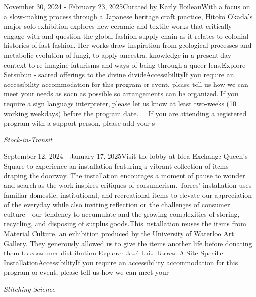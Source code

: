 \documentclass[letterpaper, 10pt]{article}
\newcommand{\subtitle}[1]{\textit{\large #1}\vspace{0.5em}}
\newcommand{\articlecontent}[1]{\small #1\vspace{1em}}
\begin{document}
\begin{multicols}{2}
{November 30, 2024 - February 23, 2025Curated by Karly BoileauWith a focus on a slow-making process through a Japanese heritage craft practice, Hitoko Okada’s major solo exhibition explores new ceramic and textile works that critically engage with and question the global fashion supply chain as it relates to colonial histories of fast fashion. Her works draw inspiration from geological processes and metabolic evolution of fungi, to apply ancestral knowledge in a present-day context to re-imagine futurisms and ways of being through a queer lens.Explore Setsubun - sacred offerings to the divine divideAccessibilityIf you require an accessibility accommodation for this program or event, please tell us how we can meet your needs as soon as possible so arrangements can be organized. If you require a sign language interpreter, please let us know at least two-weeks (10 working weekdays) before the program date.   If you are attending a registered program with a support person, please add your s
}
\vspace{10px}

\subtitle{Stock-in-Transit}

\articlecontent{

\qrcode[height=1.5cm]{https://ideaexchange.libnet.info/event/11807063}
\vspace{10px}

September 12, 2024 - January 17, 2025Visit the lobby at Idea Exchange Queen's Square to experience an installation featuring a vibrant collection of items draping the doorway. The installation encourages a moment of pause to wonder and search as the work inspires critiques of consumerism. Torres’ installation uses familiar domestic, institutional, and recreational items to elevate our appreciation of the everyday while also inviting reflection on the challenges of consumer culture—our tendency to accumulate and the growing complexities of storing, recycling, and disposing of surplus goods.This installation reuses the items from Material Culture, an exhibition produced by the University of Waterloo Art Gallery. They generously allowed us to give the items another life before donating them to consumer distribution.Explore: José Luis Torres: A Site-Specific InstallationAccessibilityIf you require an accessibility accommodation for this program or event, please tell us how we can meet your
}
\vspace{10px}

\subtitle{Stitching Science}

\articlecontent{

}
\end{multicols}
\end{document}
